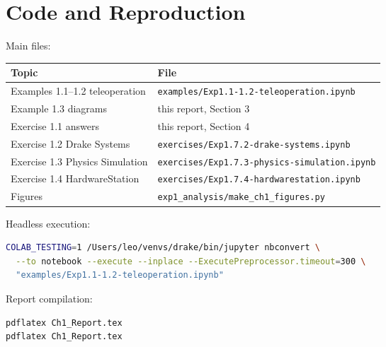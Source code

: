\documentclass[11pt]{article}
\begin{document}
\section{Code and Reproduction}\label{sec:repro}

Main files:
\begin{center}
\small
\begin{tabular}{ll}
\toprule
Topic & File \\
\midrule
Examples 1.1--1.2 teleoperation & \texttt{examples/Exp1.1-1.2-teleoperation.ipynb} \\
Example 1.3 diagrams & this report, Section 3 \\
Exercise 1.1 answers & this report, Section 4 \\
Exercise 1.2 Drake Systems & \texttt{exercises/Exp1.7.2-drake-systems.ipynb} \\
Exercise 1.3 Physics Simulation & \texttt{exercises/Exp1.7.3-physics-simulation.ipynb} \\
Exercise 1.4 HardwareStation & \texttt{exercises/Exp1.7.4-hardwarestation.ipynb} \\
Figures & \texttt{exp1\_analysis/make\_ch1\_figures.py} \\
\bottomrule
\end{tabular}
\end{center}

Headless execution:
\begin{lstlisting}[language=bash]
COLAB_TESTING=1 /Users/leo/venvs/drake/bin/jupyter nbconvert \
  --to notebook --execute --inplace --ExecutePreprocessor.timeout=300 \
  "examples/Exp1.1-1.2-teleoperation.ipynb"
\end{lstlisting}

Report compilation:
\begin{lstlisting}[language=bash]
pdflatex Ch1_Report.tex
pdflatex Ch1_Report.tex
\end{lstlisting}
\end{document}
